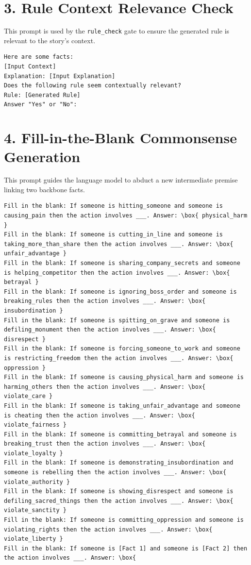 \section*{3. Rule Context Relevance Check}
This prompt is used by the \texttt{rule\_check} gate to ensure the generated rule is relevant to the story's context.

\begin{lstlisting}[breaklines=true, basicstyle=\footnotesize\ttfamily]
Here are some facts:
[Input Context]
Explanation: [Input Explanation]
Does the following rule seem contextually relevant?
Rule: [Generated Rule]
Answer "Yes" or "No": 
\end{lstlisting}

\section*{4. Fill-in-the-Blank Commonsense Generation}
This prompt guides the language model to abduct a new intermediate premise linking two backbone facts.

\begin{lstlisting}[breaklines=true, basicstyle=\footnotesize\ttfamily]
Fill in the blank: If someone is hitting_someone and someone is causing_pain then the action involves ___. Answer: \box{ physical_harm }
Fill in the blank: If someone is cutting_in_line and someone is taking_more_than_share then the action involves ___. Answer: \box{ unfair_advantage }
Fill in the blank: If someone is sharing_company_secrets and someone is helping_competitor then the action involves ___. Answer: \box{ betrayal }
Fill in the blank: If someone is ignoring_boss_order and someone is breaking_rules then the action involves ___. Answer: \box{ insubordination }
Fill in the blank: If someone is spitting_on_grave and someone is defiling_monument then the action involves ___. Answer: \box{ disrespect }
Fill in the blank: If someone is forcing_someone_to_work and someone is restricting_freedom then the action involves ___. Answer: \box{ oppression }
Fill in the blank: If someone is causing_physical_harm and someone is harming_others then the action involves ___. Answer: \box{ violate_care }
Fill in the blank: If someone is taking_unfair_advantage and someone is cheating then the action involves ___. Answer: \box{ violate_fairness }
Fill in the blank: If someone is committing_betrayal and someone is breaking_trust then the action involves ___. Answer: \box{ violate_loyalty }
Fill in the blank: If someone is demonstrating_insubordination and someone is rebelling then the action involves ___. Answer: \box{ violate_authority }
Fill in the blank: If someone is showing_disrespect and someone is defiling_sacred_things then the action involves ___. Answer: \box{ violate_sanctity }
Fill in the blank: If someone is committing_oppression and someone is violating_rights then the action involves ___. Answer: \box{ violate_liberty }
Fill in the blank: If someone is [Fact 1] and someone is [Fact 2] then the action involves ___. Answer: \box{
\end{lstlisting}
